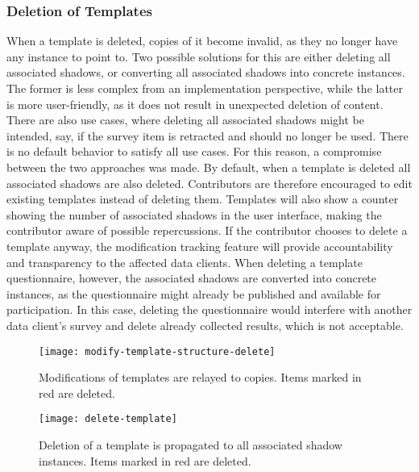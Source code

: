     \subsubsection{Deletion of Templates}
        When a template is deleted, copies of it become invalid,
        as they no longer have any instance to point to.
        Two possible solutions for this are either deleting
        all associated shadows, or converting all associated
        shadows into concrete instances. 
        The former is less complex from an implementation perspective, while the 
        latter is more user-friendly, as it does not result in unexpected 
        deletion of content. There are also use cases, where
        deleting all associated shadows might be intended,
        say, if the survey item is retracted
        and should no longer be used. There is no
        default behavior to satisfy all use cases.
        For this reason, a compromise between the two
        approaches was made. By default, when a template
        is deleted all associated shadows are also deleted.
        Contributors are therefore encouraged to edit existing
        templates instead of deleting them. Templates
        will also show a counter showing the number of
        associated shadows in the user interface, making the
        contributor aware of possible repercussions.
        If the contributor chooses to delete a template anyway,
        the modification tracking feature will provide
        accountability and transparency to the affected data clients.
        When deleting a template questionnaire, however, the
        associated shadows are converted into concrete instances,
        as the questionnaire might already be published and
        available for participation. In this case, deleting
        the questionnaire would interfere with another data
        client's survey and delete already collected results,
        which is not acceptable.

                \begin{wrapfigure}{o}{.7\textwidth}
            \centering
            \texttt{[image: modify-template-structure-delete]}
            \caption{Modifications of templates are relayed to copies. Items marked in red are deleted.}
            \label{fig:modify-concrete-structure}
        \end{wrapfigure}

        \begin{figure}[H]
            \centering
            \texttt{[image: delete-template]}
            \caption{Deletion of a template is propagated to all associated shadow instances. Items marked in red are deleted.}
            \label{fig:delete-template}
        \end{figure}

